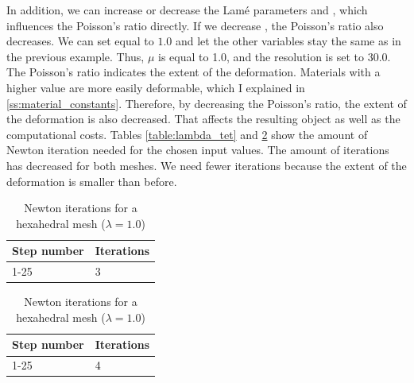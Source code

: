 In addition, we can increase or decrease the Lamé parameters \textit{\mu} and \textit{\lambda}, which influences the Poisson's ratio directly. If we decrease \textit{\lambda}, the Poisson's ratio also decreases. We can set \textit{\lambda} equal to $1.0$ and let the other variables stay the same as in the previous example. Thus, $\mu$ is equal to 1.0, and the resolution is set to 30.0. The Poisson's ratio indicates the extent of the deformation. Materials with a higher value are more easily deformable, which I explained in \autoref{ss:material_constants}. Therefore, by decreasing the Poisson's ratio, the extent of the deformation is also decreased. That affects the resulting object as well as the computational costs. Tables \ref{table:lambda_tet} and \ref{table:lambda_hex} show the amount of Newton iteration needed for the chosen input values. The amount of iterations has decreased for both meshes. We need fewer iterations because the extent of the deformation is smaller than before.

\begin{table}[!htbp]
\parbox{.45\linewidth}{
\centering
\begin{tabular}{ | l | l |}
\hline
\textbf{Step number} & \textbf{Iterations} \\ \hline
1-25 & 3 \\ \hline
\end{tabular}
\caption{Newton iterations for a tetrahedral mesh ($\lambda = 1.0$)}
\label{table:lambda_tet}
}
\hfill
\parbox{.45\linewidth}{
\centering
\begin{tabular}{ | l | l |}
\hline
\textbf{Step number} & \textbf{Iterations} \\ \hline
1-25 & 4 \\ \hline
\end{tabular}
\caption{Newton iterations for a hexahedral mesh ($\lambda = 1.0$)}
\label{table:lambda_hex}
}
\end{table}

